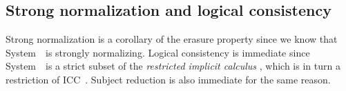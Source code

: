 
\subsection{Strong normalization and logical consistency}
\label{ssec:sn}
Strong normalization is a corollary of the erasure property since we know that
System~\Fw\ is strongly normalizing. Logical consistency is immediate since
System~\Fi\ is a strict subset of the \emph{restricted implicit calculus}
\cite{Miquel00}, which is in turn a restriction of ICC~\cite{Miquel01}.
Subject reduction is also immediate for the same reason.

